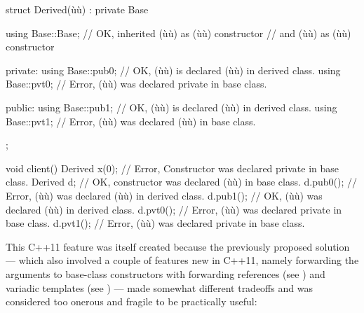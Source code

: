 \begin{emcppslisting}[emcppsbatch=e13]
struct Derived(ù{\footnotemark}ù) : private Base
{
    using Base::Base;  // OK, inherited (ù{}ù) as (ù{}ù) constructor
                       // and (ù{}ù) as (ù{}ù) constructor

private:
    using Base::pub0;  // OK, (ù{}ù) is declared (ù{}ù) in derived class.
    using Base::pvt0;  // Error, (ù{}ù) was declared private in base class.

public:
    using Base::pub1;  // OK, (ù{}ù) is declared (ù{}ù) in derived class.
    using Base::pvt1;  // Error, (ù{}ù) was declared (ù{}ù) in base class.
};

void client()
{
     Derived x(0);  // Error, Constructor was declared private in base class.
     Derived d;     // OK, constructor was declared (ù{}ù) in base class.
     d.pub0();      // Error, (ù{}ù) was declared (ù{}ù) in derived class.
     d.pub1();      // OK, (ù{}ù) was declared (ù{}ù) in derived class.
     d.pvt0();      // Error, (ù{}ù) was declared private in base class.
     d.pvt1();      // Error, (ù{}ù) was declared private in base class.
}
\end{emcppslisting}
{\cprotect{}}
    
\noindent This C++11 feature was itself created because the previously proposed
solution --- which also involved a couple of features new in C++11, namely
forwarding the arguments to base-class constructors with
forwarding references (see ) 
and variadic
templates (see ) 
--- made somewhat different tradeoffs and was
considered too onerous and fragile to be practically useful:

